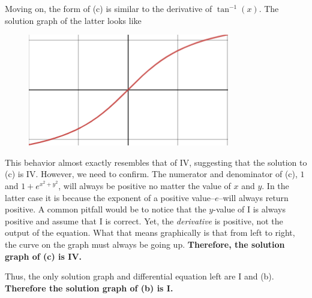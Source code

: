 \documentclass{article}
\begin{document}
\begin{enumerate}[label=\textbf{\arabic*.}]
\bigskip

Moving on, the form of (c) is similar to the derivative of $\tan^{-1}(x)$. The solution graph of the latter looks like 
\begin{figure}[H]
\centering
\includegraphics[scale=0.55]{arctan}
\end{figure}
This behavior almost exactly resembles that of IV, suggesting that the solution to (c) is IV. However, we need to confirm. The numerator and denominator of (c), $1$ and $1+e^{x^2+y^2}$, will always be positive no matter the value of $x$ and $y$. In the latter case it is because the exponent of a positive value--$e$--will always return positive. A common pitfall would be to notice that the $y$-value of I is always positive and assume that I is correct. Yet, the \textit{derivative} is positive, not the  output of the equation. What that means graphically is that from left to right, the curve on the graph must always be going up. \textbf{Therefore, the solution graph of (c) is IV.}

\bigskip

Thus, the only solution graph and differential equation left are I and (b). \textbf{Therefore the solution graph of (b) is I.}


\end{enumerate}
\end{document}
